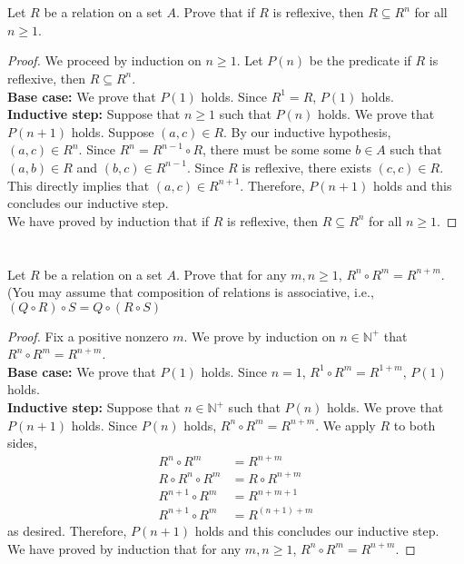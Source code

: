 \documentclass[11pt]{scrartcl}
\begin{document}
\section{}
Let $R$ be a relation on a set $A$. Prove that if $R$ is reflexive, then $R \subseteq R^n$
for all $n \geq 1$.
\begin{proof}
	We proceed by induction on  $n \geq 1$. Let $P(n)$ be the predicate
	if $R$ is reflexive, then $R \subseteq R^n$.\\
	\textbf{Base case:} We prove that $P(1)$ holds. Since $R^1 = R$, $P(1)$ holds.\\
	\textbf{Inductive step:} Suppose that $n \geq 1$ such that $P(n)$ holds. We prove that $P(n + 1)$ holds.
	Suppose $(a,c) \in R$.
	By our inductive hypothesis, $(a,c) \in R^{n}$.
	Since $R^{n} = R^{n-1} \circ R$, there must be some some $b \in A$ such that
	$(a,b) \in R$ and $(b,c) \in R^{n-1}$.
	Since $R$ is reflexive, there exists $(c,c) \in R$. This directly implies that
	$(a,c) \in R^{n+1}$.
	Therefore, $P(n+1)$ holds and this concludes our inductive step.\\
	We have proved by induction that if $R$ is reflexive, then $R \subseteq R^n$
	for all $n \geq 1$.
\end{proof}

\section{}
Let $R$ be a relation on a set $A$. Prove that for any $m, n \geq 1$, 
$R^n \circ R^m = R^{n+m}$. (You may assume that composition of relations is associative,
i.e., $(Q \circ R) \circ S = Q \circ (R \circ S)$
\begin{proof}
	Fix a positive nonzero $m$. We prove by induction on $n\in \mathbb{N}^+$
	that $R^n \circ R^m = R^{n+m}$.	\\
	\textbf{Base case:} We prove that $P(1)$ holds. Since $n=1$, $R^1 \circ R^m = R^{1+m}$, $P(1)$ holds.\\
	\textbf{Inductive step:} Suppose that $n \in \mathbb{N}^+$ such that $P(n)$ holds. We prove that $P(n + 1)$ holds.
	Since $P(n)$ holds, $R^n \circ R^m = R^{n+m}$. We apply $R$ to both sides,
	\begin{align*}
		R^n \circ R^m & = R^{n+m}\\
		R \circ R^n \circ R^m & = R \circ R^{n+m}\\
		R^{n+1} \circ R^m & = R^{n+m +1}\\
		R^{n+1} \circ R^m & = R^{(n+ 1) +m}
	\end{align*}
	as desired. Therefore, $P(n+1)$ holds and this concludes our inductive step.\\
	We have proved by induction that for any $m, n \geq 1$, 
	$R^n \circ R^m = R^{n+m}$.
\end{proof}
\end{document}
